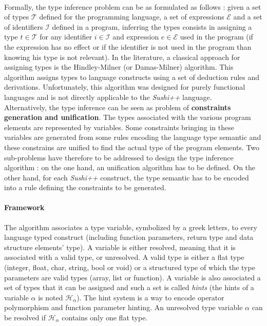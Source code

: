 \documentclass[a4paper,11pt]{article}
\begin{document}
\paragraph{}
Formally, the type inference problem can be as formulated as follows : given a set of types $\mathcal{T}$ defined for the programming language, a set of expressions $\mathcal{E}$ and a set of identifiers $\mathcal{I}$ defined in a program, inferring the types consists in assigning a type $t \in \mathcal{T}$ for any identifier $i \in \mathcal{I}$ and expression $e \in \mathcal{E}$ used in the program (if the expression has no effect or if the identifier is not used in the program than knowing his type is not relevant). In the literature, a classical approach for assigning types is the Hindley-Milner (or Damas-Milner) algorithm. This algorithm assigns types to language constructs using a set of deduction rules and derivations. Unfortunately, this algorithm was designed for purely functional languages and is not directly applicable to the \textit{Sushi++} language. \\
Alternatively, the type inference can be seen as problem of \textbf{constraints generation and unification}. The types associated with the various program elements are represented by variables. Some constraints bringing in these variables are generated from some rules encoding the language type semantic and these constrains are unified to find the actual type of the program elements. Two sub-problems have therefore to be addressed to design the type inference algorithm : on the one hand, an unification algorithm has to be defined. On the other hand, for each \textit{Sushi++} construct, the type semantic has to be encoded into a rule defining the constraints to be generated.
\paragraph{Framework} The algorithm associates a type variable, symbolized by a greek letters, to every language typed construct (including function parameters, return type and data structure elements' type). A variable is either resolved, meaning that it is associated with a valid type, or unresolved. A valid type is either a flat type (integer, float, char, string, bool or void) or a structured type of which the type parameters are valid types (array, list or function). A variable is also associated a set of types that it can be assigned and such a set is called \textit{hints} (the hints of a variable $\alpha$ is noted $\mathcal{H}_\alpha$). The hint system is a way to encode operator polymorphism and function parameter hinting. An unresolved type variable $\alpha$ can be resolved if $\mathcal{H}_\alpha$ contains only one flat type. 
\end{document}
